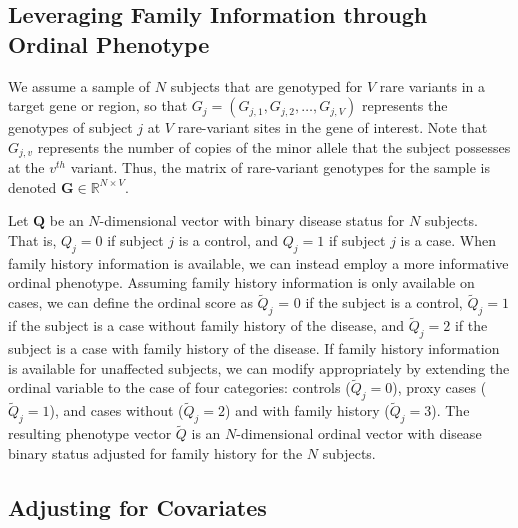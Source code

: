 \documentclass[]{article}
\begin{document}
\hypertarget{leveraging-family-information-through-ordinal-phenotype}{%
\subsection{Leveraging Family Information through Ordinal Phenotype}\label{leveraging-family-information-through-ordinal-phenotype}}

We assume a sample of \(N\) subjects that are genotyped for \(V\) rare variants
in a target gene or region, so that \(G_j = (G_{j,1}, G_{j,2},\dots, G_{j,V})\)
represents the genotypes of subject \(j\) at \(V\) rare-variant sites in the gene of interest.
Note that \(G_{j,v}\) represents the number of copies of the minor allele that
the subject possesses at the \(v^{th}\) variant. Thus, the matrix of rare-variant
genotypes for the sample is denoted \(\mathbf{G} \in \mathbb{R}^{N \times V}\).

Let \(\mathbf{Q}\) be an \(N\)-dimensional vector with binary disease status for \(N\) subjects. That is, \(Q_j=0\) if subject \(j\) is a control,
and \(Q_j=1\) if subject \(j\) is a case.
When family history
information is available,
we can instead employ a more informative
ordinal phenotype. Assuming family history information is only available on cases, we can define the ordinal score as \(\tilde{Q}_j\) = \(0\)
if the subject is a control, \(\tilde{Q}_j =1\) if the subject is a case
without family history of the disease, and \(\tilde{Q}_j =2\) if the subject
is a case with family history of the disease. If family history information is available for unaffected subjects, we can modify appropriately by extending the ordinal variable to the case of four categories: controls (\(\tilde{Q}_j=0\)), proxy cases (\(\tilde{Q}_j=1\)), and cases
without (\(\tilde{Q}_j=2\)) and with family history (\(\tilde{Q}_j=3\)). The resulting phenotype vector \(\tilde{Q}\) is an \(N\)-dimensional ordinal vector with disease binary
status adjusted for family history for the \(N\) subjects.

\hypertarget{adjusting-for-covariates}{%
\subsection{Adjusting for Covariates}\label{adjusting-for-covariates}}
\end{document}
